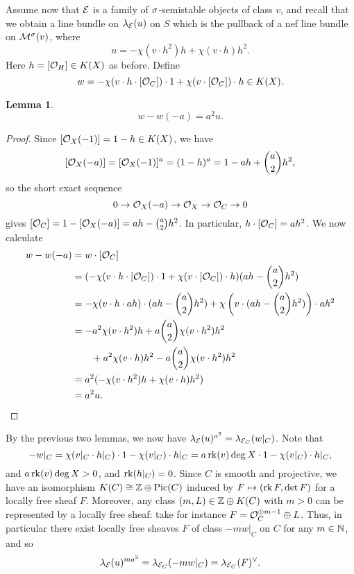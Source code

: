 \documentclass[letterpaper,11pt]{amsart}%
\newtheorem{lem}[thm]{Lemma}
\theoremstyle{remark}
\begin{document}
Assume now that $\mathcal{E}$ is a family of $\sigma$-semistable objects of class $v$, and recall that we obtain a line bundle on $\lambda_{\mathcal{E}}(u)$ on $S$ which is the pullback of a nef line bundle on $\mathcal{M}^\sigma(v)$, where 
\[ u = -\chi(v \cdot h^2) h + \chi(v \cdot h) h^2. \]
Here $h = [\mathcal{O}_H] \in K(X)$ as before. Define
\[ w = -\chi(v \cdot h \cdot [\mathcal{O}_C]) \cdot 1 + \chi(v \cdot [\mathcal{O}_C]) \cdot h \in K(X). \]
\begin{lem}
    \[ w - w(-a) = a^2 u. \]
\end{lem}
\begin{proof}
    Since $[\mathcal{O}_X(-1)] = 1 - h \in K(X)$, we have
    \[ [\mathcal{O}_X(-a)] = [\mathcal{O}_X(-1)]^a = (1 - h)^a = 1 - a h + \binom{a}{2} h^2, \]
    so the short exact sequence
    \[ 0 \to \mathcal{O}_X(-a) \to \mathcal{O}_X \to \mathcal{O}_C \to 0 \]
    gives $[\mathcal{O}_C] = 1 - [\mathcal{O}_X(-a)] = a h - \binom{a}{2} h^2$. In particular, $h \cdot [\mathcal{O}_C] = a h^2$. We now calculate
    \begin{align*}
        w - w(-a) & = w \cdot [\mathcal{O}_C] \\
        & = (-\chi(v \cdot h \cdot [\mathcal{O}_C]) \cdot 1 + \chi(v \cdot [\mathcal{O}_C]) \cdot h) (a h - \binom{a}{2} h^2) \\
        & = - \chi(v \cdot h \cdot ah) \cdot (a h - \binom{a}{2} h^2) + \chi\left(v \cdot (a h - \binom{a}{2} h^2)\right) \cdot a h^2 \\
        & = - a^2 \chi(v \cdot h^2) h + a \binom{a}{2} \chi(v \cdot h^2) h^2 \\
        & \qquad + a^2 \chi(v \cdot h) h^2 - a \binom{a}{2} \chi(v \cdot h^2) h^2 \\
        & = a^2 ( - \chi(v \cdot h^2) h + \chi(v \cdot h) h^2) \\
        & = a^2 u.
    \end{align*}
\end{proof}
By the previous two lemmas, we now have $\lambda_{\mathcal{E}}(u)^{a^2} = \lambda_{\mathcal{E}_C}(w|_C)$. Note that 
\[ -w|_C = \chi(v|_C \cdot h|_C) \cdot 1 - \chi(v|_C) \cdot h|_C = a \operatorname{\mathrm{rk}}(v) \deg X \cdot 1 - \chi(v|_C) \cdot h|_C, \]
and $a \operatorname{\mathrm{rk}}(v) \deg X > 0$, and $\operatorname{\mathrm{rk}}(h|_C) = 0$. Since $C$ is smooth and projective, we have an isomorphism $K(C) \cong \mathbb{Z} \oplus \mathrm{Pic}(C)$ induced by $F \mapsto (\operatorname{\mathrm{rk}} F, \det F)$ for a locally free sheaf $F$. Moreover, any class $(m, L) \in \mathbb{Z} \oplus K(C)$ with $m > 0$ can be represented by a locally free sheaf: take for instance $F = \mathcal{O}_C^{\oplus m-1} \oplus L$. Thus, in particular there exist locally free sheaves $F$ of class $-m w|_C$ on $C$ for any $m \in \mathbb{N}$, and so
\[ \lambda_{\mathcal{E}}(u)^{m a^2} = \lambda_{\mathcal{E}_C}(-m w|_C) = \lambda_{\mathcal{E}_C}(F)^\vee. \]
\end{document}
